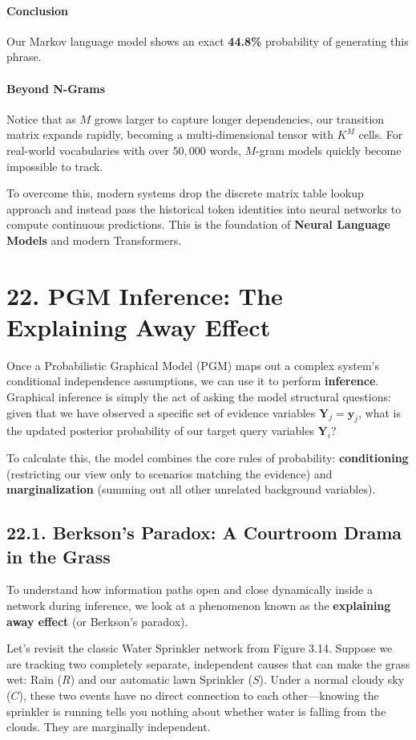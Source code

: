 \documentclass{article}
\begin{document}
\paragraph{Conclusion}
Our Markov language model shows an exact \textbf{44.8\%} probability of generating this phrase.

\paragraph{Beyond N-Grams}
Notice that as $M$ grows larger to capture longer dependencies, our transition matrix expands rapidly, becoming a multi-dimensional tensor with $K^M$ cells. For real-world vocabularies with over $50,000$ words, $M$-gram models quickly become impossible to track. 

To overcome this, modern systems drop the discrete matrix table lookup approach and instead pass the historical token identities into neural networks to compute continuous predictions. This is the foundation of \textbf{Neural Language Models} and modern Transformers.

\section*{22. PGM Inference: The Explaining Away Effect}

Once a Probabilistic Graphical Model (PGM) maps out a complex system's conditional independence assumptions, we can use it to perform \textbf{inference}. Graphical inference is simply the act of asking the model structural questions: given that we have observed a specific set of evidence variables $\mathbf{Y}_j = \mathbf{y}_j$, what is the updated posterior probability of our target query variables $\mathbf{Y}_i$? 

To calculate this, the model combines the core rules of probability: \textbf{conditioning} (restricting our view only to scenarios matching the evidence) and \textbf{marginalization} (summing out all other unrelated background variables).

\subsection*{22.1. Berkson's Paradox: A Courtroom Drama in the Grass}
To understand how information paths open and close dynamically inside a network during inference, we look at a phenomenon known as the \textbf{explaining away effect} (or Berkson's paradox).

Let's revisit the classic Water Sprinkler network from Figure 3.14. Suppose we are tracking two completely separate, independent causes that can make the grass wet: Rain ($R$) and our automatic lawn Sprinkler ($S$). Under a normal cloudy sky ($C$), these two events have no direct connection to each other—knowing the sprinkler is running tells you nothing about whether water is falling from the clouds. They are marginally independent.
\end{document}

